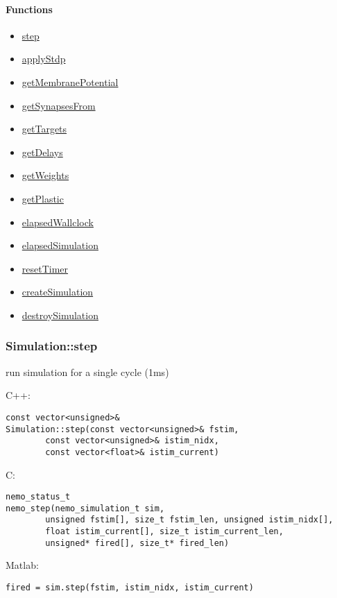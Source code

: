\paragraph{Functions}
\begin{itemize}
\item \hyperref[fn: step]{step}
\item \hyperref[fn: applyStdp]{applyStdp}
\item \hyperref[fn: getMembranePotential]{getMembranePotential}
\item \hyperref[fn: getSynapsesFrom]{getSynapsesFrom}
\item \hyperref[fn: getTargets]{getTargets}
\item \hyperref[fn: getDelays]{getDelays}
\item \hyperref[fn: getWeights]{getWeights}
\item \hyperref[fn: getPlastic]{getPlastic}
\item \hyperref[fn: elapsedWallclock]{elapsedWallclock}
\item \hyperref[fn: elapsedSimulation]{elapsedSimulation}
\item \hyperref[fn: resetTimer]{resetTimer}
\item \hyperref[fn: createSimulation]{createSimulation}
\item \hyperref[fn: destroySimulation]{destroySimulation}
\end{itemize}
\clearpage
\subsubsection*{Simulation::step}
\label{fn: step}
run simulation for a single cycle (1ms)


\noindent C++:
\begin{lstlisting}[aboveskip=2pt]
const vector<unsigned>&
Simulation::step(const vector<unsigned>& fstim, 
        const vector<unsigned>& istim_nidx, 
        const vector<float>& istim_current)
\end{lstlisting}

\noindent C:
\begin{lstlisting}[aboveskip=2pt]
nemo_status_t
nemo_step(nemo_simulation_t sim, 
        unsigned fstim[], size_t fstim_len, unsigned istim_nidx[], 
        float istim_current[], size_t istim_current_len, 
        unsigned* fired[], size_t* fired_len)
\end{lstlisting}

\noindent Matlab:
\begin{lstlisting}[aboveskip=2pt]
fired = sim.step(fstim, istim_nidx, istim_current)
\end{lstlisting}
